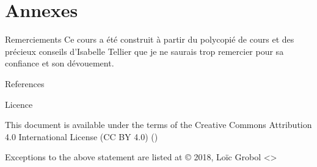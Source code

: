 \documentclass[hyperref={unicode}, xcolor={svgnames}, french]{beamer}
\begin{document}
\appendix
{}  %
\section{Annexes}
\begin{frame}{Remerciements}
    Ce cours a été construit à partir du polycopié de cours  \parencite{tellier2017fouille} et des précieux conseils d'Isabelle Tellier que je ne saurais trop remercier pour sa confiance et son dévouement.
\end{frame}

\begin{frame}[allowframebreaks]{References}
    \printbibliography[heading=none]
\end{frame}

\begin{frame}{Licence}
    \begin{center}
        {\huge \ccby}
        \vfill
        This document is available under the terms of the Creative Commons Attribution 4.0 International License (CC BY 4.0) ()

        Exceptions to the above statement are listed at {\small{}}
        \vfill
        © 2018, Loïc Grobol <>

    \end{center}
\end{frame}
\end{document}
